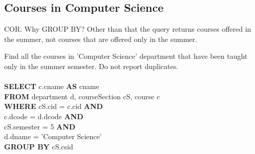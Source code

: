 \documentclass[11pt]{article}
\begin{document}
\subsection{Courses in Computer Science}

COR. Why GROUP BY? Other than that the query returns courses offered in the summer, not courses that are offered only in the summer.

Find all the courses in 'Computer Science' department that have been taught only in the summer semester. Do not report duplicates.\\
~\\
\textbf{SELECT} c.cname \textbf{AS} cname\\
\textbf{FROM} department d, courseSection cS, course c\\
\textbf{WHERE} cS.cid = c.cid \textbf{AND}\\
c.dcode = d.dcode \textbf{AND}\\
cS.semester = 5 \textbf{AND}\\
d.dname = 'Computer Science'\\
\textbf{GROUP BY} cS.csid
\end{document}
